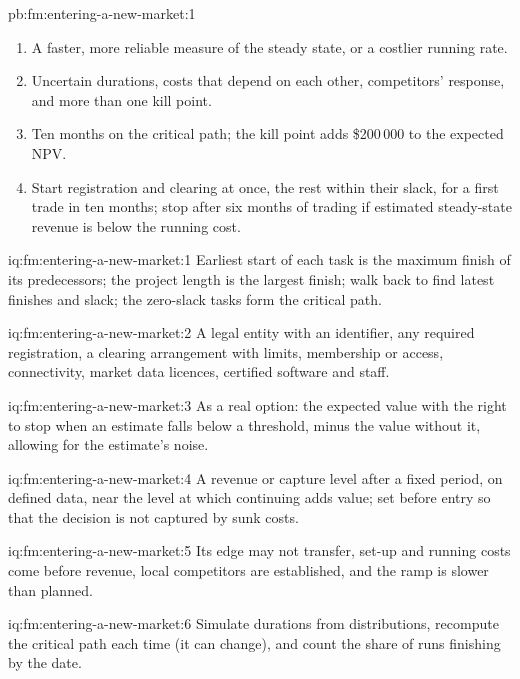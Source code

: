 \begin{solution}{pb:fm:entering-a-new-market:1}
\begin{enumerate}
\item A faster, more reliable measure of the steady state, or a costlier running rate.
\item Uncertain durations, costs that depend on each other, competitors' response, and more than one kill point.
\item Ten months on the critical path; the kill point adds \$200\,000 to the expected NPV.
\item Start registration and clearing at once, the rest within their slack, for a first trade in ten months; stop after six months of trading if
estimated steady-state revenue is below the running cost.
\end{enumerate}
\end{solution}

\begin{solution}{iq:fm:entering-a-new-market:1}
Earliest start of each task is the maximum finish of its predecessors; the project length is the largest finish; walk back to find latest
finishes and slack; the zero-slack tasks form the critical path.
\end{solution}

\begin{solution}{iq:fm:entering-a-new-market:2}
A legal entity with an identifier, any required registration, a clearing arrangement with limits, membership or access, connectivity, market data
licences, certified software and staff.
\end{solution}

\begin{solution}{iq:fm:entering-a-new-market:3}
As a real option: the expected value with the right to stop when an estimate falls below a threshold, minus the value without it, allowing for the
estimate's noise.
\end{solution}

\begin{solution}{iq:fm:entering-a-new-market:4}
A revenue or capture level after a fixed period, on defined data, near the level at which continuing adds value; set before entry so that the
decision is not captured by sunk costs.
\end{solution}

\begin{solution}{iq:fm:entering-a-new-market:5}
Its edge may not transfer, set-up and running costs come before revenue, local competitors are established, and the ramp is slower than planned.
\end{solution}

\begin{solution}{iq:fm:entering-a-new-market:6}
Simulate durations from distributions, recompute the critical path each time (it can change), and count the share of runs finishing by the date.
\end{solution}
